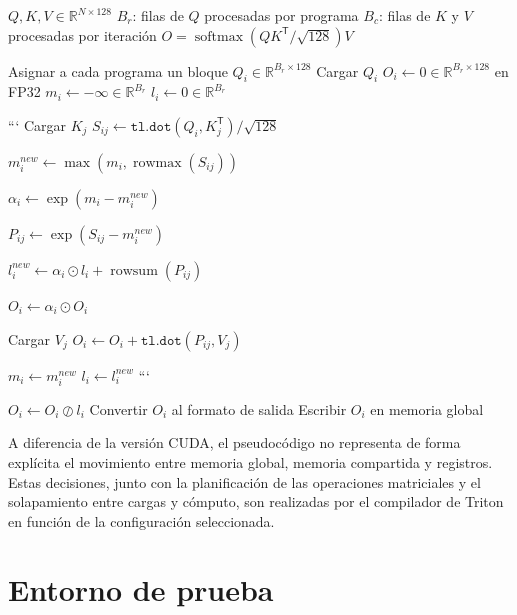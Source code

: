 \begin{algorithm}[H]
\caption{FlashAttention Triton}
\label{alg:flashattention_triton}
\begin{algorithmic}[1]

\Require \(Q,K,V\in\mathbb{R}^{N\times128}\)
\Require \(B_r\): filas de \(Q\) procesadas por programa
\Require \(B_c\): filas de \(K\) y \(V\) procesadas por iteración
\Ensure \(O=\operatorname{softmax}(QK^\mathsf{T}/\sqrt{128})V\)

\State Asignar a cada programa un bloque \(Q_i\in\mathbb{R}^{B_r\times128}\)
\State Cargar \(Q_i\)
\State \(O_i \gets 0 \in \mathbb{R}^{B_r\times128}\) en FP32
\State \(m_i \gets -\infty \in \mathbb{R}^{B_r}\)
\State \(l_i \gets 0 \in \mathbb{R}^{B_r}\)


```
\State Cargar \(K_j\)
\State \(S_{ij} \gets \texttt{tl.dot}(Q_i,K_j^\mathsf{T})/\sqrt{128}\)

\State \(m_i^{new}
    \gets
    \max\left(
        m_i,
        \operatorname{rowmax}(S_{ij})
    \right)\)

\State \(\alpha_i
    \gets
    \exp(m_i-m_i^{new})\)

\State \(P_{ij}
    \gets
    \exp(S_{ij}-m_i^{new})\)

\State \(l_i^{new}
    \gets
    \alpha_i\odot l_i
    +
    \operatorname{rowsum}(P_{ij})\)

\State \(O_i \gets \alpha_i\odot O_i\)

\State Cargar \(V_j\)
\State \(O_i
    \gets
    O_i
    +
    \texttt{tl.dot}(P_{ij},V_j)\)

\State \(m_i \gets m_i^{new}\)
\State \(l_i \gets l_i^{new}\)
```

\EndFor

\State \(O_i \gets O_i\oslash l_i\)
\State Convertir \(O_i\) al formato de salida
\State Escribir \(O_i\) en memoria global

\end{algorithmic}
\end{algorithm}

A diferencia de la versión CUDA, el pseudocódigo no representa de forma explícita el movimiento entre memoria global, memoria compartida y registros. Estas decisiones, junto con la planificación de las operaciones matriciales y el solapamiento entre cargas y cómputo, son realizadas por el compilador de Triton en función de la configuración seleccionada.

\chapter {Entorno de prueba}

